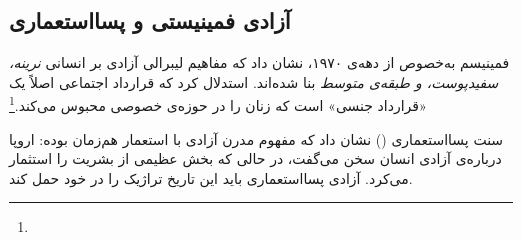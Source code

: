 \subsection{آزادی فمینیستی و پسااستعماری}
\label{subsec:fem}

فمینیسم به‌خصوص از دهه‌ی ۱۹۷۰، نشان داد که مفاهیم لیبرالی آزادی بر انسانی \textit{نرینه، سفیدپوست، و طبقه‌ی متوسط} بنا شده‌اند.  استدلال کرد که قرارداد اجتماعی اصلاً یک «قرارداد جنسی» است که زنان را در حوزه‌ی خصوصی محبوس می‌کند.\footnote{} %

سنت پسااستعماری () نشان داد که مفهوم مدرن آزادی با استعمار هم‌زمان بوده: اروپا درباره‌ی آزادی انسان سخن می‌گفت، در حالی که بخش عظیمی از بشریت را استثمار می‌کرد. آزادی پسااستعماری باید این تاریخ تراژیک را در خود حمل کند.

\newpage
